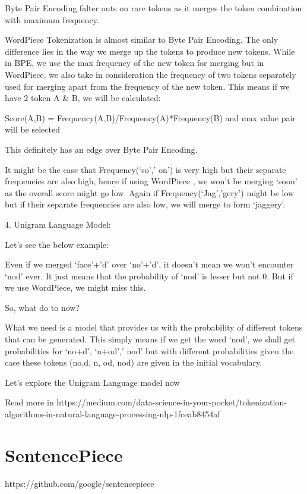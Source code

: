 Byte Pair Encoding falter outs on rare tokens as it merges the token combination with maximum frequency.

WordPiece Tokenization is almost similar to Byte Pair Encoding. The only difference lies in the way we merge up the tokens to produce new tokens. While in BPE, we use the max frequency of the new token for merging but in WordPiece, we also take in consideration the frequency of two tokens separately used for merging apart from the frequency of the new token. This means if we have 2 token A \& B, we will be calculated:

Score(A,B) = Frequency(A,B)/Frequency(A)*Frequency(B) and max value pair will be selected

This definitely has an edge over Byte Pair Encoding.

It might be the case that Frequency(‘so’,’ on’) is very high but their separate frequencies are also high, hence if using WordPiece , we won’t be merging ‘soon’ as the overall score might go low. Again if Frequency(‘Jag’,’gery’) might be low but if their separate frequencies are also low, we will merge to form ‘jaggery’.

4. Unigram Language Model:

Let’s see the below example:

Even if we merged ‘face’+’d’ over ‘no’+’d’, it doesn’t mean we won’t encounter ‘nod’ ever. It just means that the probability of ‘nod’ is lesser but not 0. But if we use WordPiece, we might miss this.

So, what do to now?

What we need is a model that provides us with the probability of different tokens that can be generated. This simply means if we get the word ‘nod’, we shall get probabilities for ‘no+d’, ‘n+od’,’ nod’ but with different probabilities given the case these tokens (no,d, n, od, nod) are given in the initial vocabulary.

Let’s explore the Unigram Language model now

Read more in https://medium.com/data-science-in-your-pocket/tokenization-algorithms-in-natural-language-processing-nlp-1fceab8454af

\section{SentencePiece}

https://github.com/google/sentencepiece

